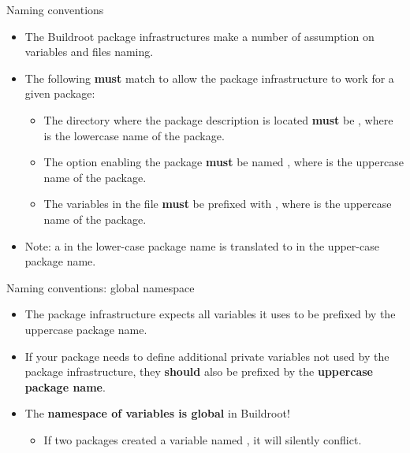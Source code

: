 \begin{frame}{Naming conventions}

  \begin{itemize}
  \item The Buildroot package infrastructures make a number of
    assumption on variables and files naming.
  \item The following {\bf must} match to allow the package
    infrastructure to work for a given package:
    \begin{itemize}
    \item The directory where the package description is located {\bf
        must} be , where  is the
      lowercase name of the package.
    \item The  option enabling the package {\bf must}
      be named , where  is the
      uppercase name of the package.
    \item The variables in the  file {\bf must} be prefixed
      with , where  is the uppercase name of
      the package.
    \end{itemize}
  \item Note: a \code{-} in the lower-case package name is translated
    to \code{_} in the upper-case package name.
  \end{itemize}
\end{frame}

\begin{frame}{Naming conventions: global namespace}
  \begin{itemize}
  \item The package infrastructure expects all variables it uses to be
    prefixed by the uppercase package name.
  \item If your package needs to define additional private variables
    not used by the package infrastructure, they {\bf should} also be
    prefixed by the {\bf uppercase package name}.
  \item The {\bf namespace of variables is global} in Buildroot!
    \begin{itemize}
    \item If two packages created a variable named ,
      it will silently conflict.
    \end{itemize}
  \end{itemize}
\end{frame}

